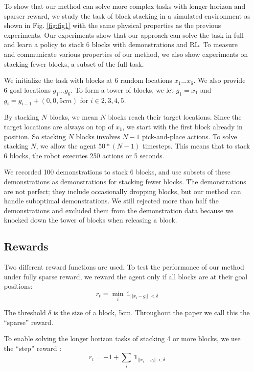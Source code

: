 To show that our method can solve more complex tasks with longer horizon and sparser reward, we study %
the task of block stacking in a simulated  environment as shown in Fig. \ref{fig:fig1} with the same physical properties as the previous experiments. Our experiments show that our approach can solve the task in full and learn a policy to stack 6 blocks with demonstrations and RL.  To measure and communicate various properties of our method, we also show experiments on stacking fewer blocks, a subset of the full task.

We initialize the task with blocks at 6 random locations $x_1 ... x_6$. We also provide 6 goal locations $g_1 ... g_6$. To form a tower of blocks, we let $g_1 = x_1$ and $g_i = g_{i-1} + (0, 0, 5cm)$ for $i \in 2, 3, 4, 5$.

By stacking $N$ blocks, we mean $N$ blocks reach their target locations. Since the target locations are always on top of $x_1$, we start with the first block already in position. So stacking $N$ blocks involves $N-1$ pick-and-place actions. To solve stacking $N$, we allow the agent $50 * (N-1)$ timesteps. This means that to stack 6 blocks, the robot executes 250 actions or 5 seconds.

We recorded 100 demonstrations to stack 6 blocks, and use subsets of these demonstrations as demonstrations for stacking fewer blocks. The demonstrations are not perfect; they include occasionally dropping blocks, but our method can handle suboptimal demonstrations. We still rejected more than half the demonstrations and excluded them from the demonstration data because we knocked down the tower of blocks when releasing a block.

\subsection{Rewards}

Two different reward functions are used. To test the performance of our method under fully sparse reward, we reward the agent only if all blocks are at their goal positions:
\begin{equation}
    r_t = \min_i \, \mathds{1}_{||x_i - g_i|| < \delta}
\end{equation}

\noindent The threshold $\delta$ is the size of a block, 5cm. Throughout the paper we call this the ``sparse'' reward.

To enable solving the longer horizon tasks of stacking 4 or more blocks, we use the ``step'' reward :
\begin{equation}
    r_t = -1 + \sum_i \, \mathds{1}_{||x_i - g_i|| < \delta}
\end{equation}

